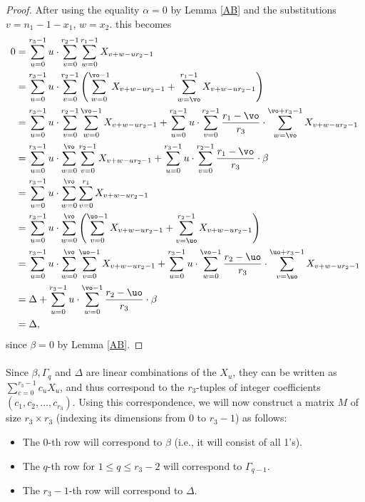 \begin{proof}
After using the equality $\alpha=0$ by Lemma \ref{AB} and the substitutions $v=n_1-1-x_1$, $w=x_2$. this becomes
\begin{align*}
0&=\sum_{u=0}^{r_3-1}u\cdot \sum_{v=0}^{r_2-1}\sum _{w=0}^{r_1-1}X_{v+w-ur_2-1}\\
&=\sum_{u=0}^{r_3-1}u\cdot \sum_{v=0}^{r_2-1}\left(\sum _{w=0}^{\vo-1}X_{v+w-ur_2-1}+\sum _{w=\vo}^{r_1-1}X_{v+w-ur_2-1}\right)\\
&=\sum_{u=0}^{r_3-1}u\cdot \sum_{v=0}^{r_2-1}\sum _{w=0}^{\vo-1}X_{v+w-ur_2-1}+\sum_{u=0}^{r_3-1}u\cdot \sum_{v=0}^{r_2-1}\frac{r_1-\vo}{r_3}\cdot\sum _{w=\vo}^{\vo + r_3-1}X_{v+w-ur_2-1}\\
&=\sum_{u=0}^{r_3-1}u\cdot \sum _{w=0}^{\vo} \sum_{v=0}^{r_2-1} X_{v+w-ur_2-1}+\sum_{u=0}^{r_3-1}u\cdot \sum_{v=0}^{r_2-1}\frac{r_1-\vo}{r_3}\cdot \beta\\
&=\sum_{u=0}^{r_3-1}u\cdot \sum _{w=0}^{\vo} \sum_{v=0}^{r_1} X_{v+w-ur_2-1}\\
&=\sum_{u=0}^{r_3-1}u\cdot \sum _{w=0}^{\vo}\left( \sum_{v=0}^{\uo-1} X_{v+w-ur_2-1}+\sum_{v=\uo}^{r_2-1} X_{v+w-ur_2-1}\right)\\
&=\sum_{u=0}^{r_3-1}u\cdot \sum _{w=0}^{\vo} \sum_{v=0}^{\uo-1} X_{v+w-ur_2-1}+\sum_{u=0}^{r_3-1}u\cdot \sum _{w=0}^{\vo-1}\frac{r_2-\uo}{r_3}\cdot \sum_{v=\uo}^{\uo+r_3-1} X_{v+w-ur_2-1}\\
&=\Delta+\sum_{u=0}^{r_3-1}u\cdot \sum _{w=0}^{\vo-1}\frac{r_2-\uo}{r_3}\cdot \beta\\
&=\Delta,
\end{align*}
since $\beta=0$ by Lemma \ref{AB}.
\end{proof}

\paragraph*{}
Since $\beta,\Gamma_q$ and $\Delta$ are linear combinations of the $X_u$, they can be written as $\sum_{c=0}^{r_3-1}c_uX_u$, and thus correspond to the $r_3$-tuples of integer coefficients $(c_1,c_2,\dots,c_{r_3})$. Using this correspondence, we will now construct a matrix $M$ of size $r_3\times r_3$ (indexing its dimensions from $0$ to $r_3-1$) as follows:
\begin{itemize}
\item The $0$-th row will correspond to $\beta$ (i.e., it will consist of all 1's).
\item The $q$-th row for $1\leq q\leq r_3-2$ will correspond to $\Gamma_{q-1}$.
\item The $r_3-1$-th row will correspond to $\Delta$.
\end{itemize}

